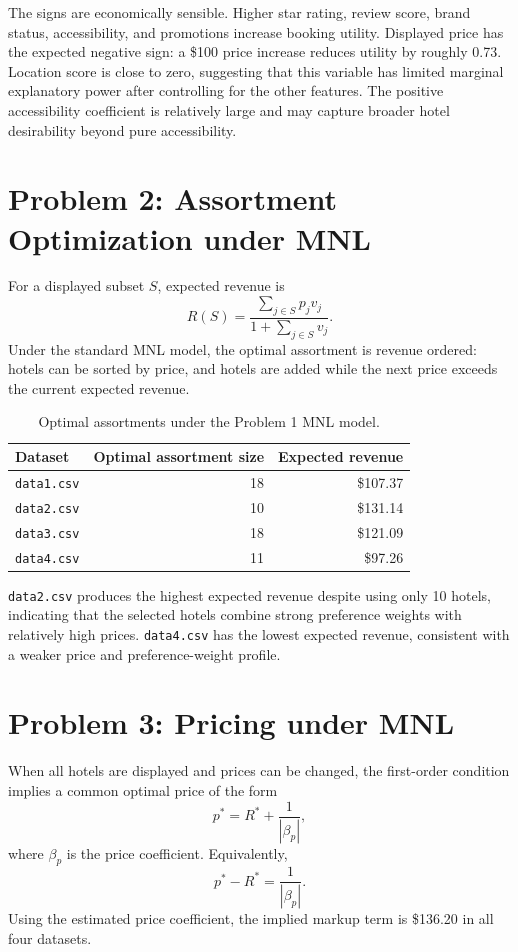\documentclass[11pt]{article}
\begin{document}
The signs are economically sensible. Higher star rating, review score, brand status, accessibility, and promotions increase booking utility. Displayed price has the expected negative sign: a \$100 price increase reduces utility by roughly 0.73. Location score is close to zero, suggesting that this variable has limited marginal explanatory power after controlling for the other features. The positive accessibility coefficient is relatively large and may capture broader hotel desirability beyond pure accessibility.

\section{Problem 2: Assortment Optimization under MNL}

For a displayed subset $S$, expected revenue is
\[
R(S) = \frac{\sum_{j \in S} p_j v_j}{1 + \sum_{j \in S} v_j}.
\]
Under the standard MNL model, the optimal assortment is revenue ordered: hotels can be sorted by price, and hotels are added while the next price exceeds the current expected revenue.

\begin{table}[H]
\centering
\caption{Optimal assortments under the Problem 1 MNL model.}
\begin{tabular}{lrr}
\toprule
Dataset & Optimal assortment size & Expected revenue \\
\midrule
\texttt{data1.csv} & 18 & \$107.37 \\
\texttt{data2.csv} & 10 & \$131.14 \\
\texttt{data3.csv} & 18 & \$121.09 \\
\texttt{data4.csv} & 11 & \$97.26 \\
\bottomrule
\end{tabular}
\end{table}

\texttt{data2.csv} produces the highest expected revenue despite using only 10 hotels, indicating that the selected hotels combine strong preference weights with relatively high prices. \texttt{data4.csv} has the lowest expected revenue, consistent with a weaker price and preference-weight profile.

\section{Problem 3: Pricing under MNL}

When all hotels are displayed and prices can be changed, the first-order condition implies a common optimal price of the form
\[
p^* = R^* + \frac{1}{|\beta_p|},
\]
where $\beta_p$ is the price coefficient. Equivalently,
\[
p^* - R^* = \frac{1}{|\beta_p|}.
\]
Using the estimated price coefficient, the implied markup term is \$136.20 in all four datasets.
\end{document}
